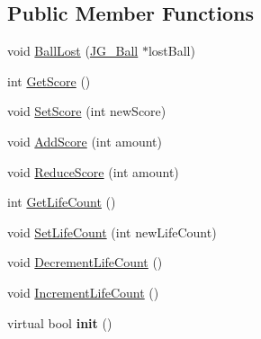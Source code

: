 \subsection*{Public Member Functions}
\begin{DoxyCompactItemize}
\item 
void \hyperlink{class_j_g___game___main_a36ec5b32f8d745363bafa97dbcfc63fd}{Ball\-Lost} (\hyperlink{class_j_g___ball}{J\-G\-\_\-\-Ball} $\ast$lost\-Ball)
\item 
int \hyperlink{class_j_g___game___main_afa38293cf043c824ccfa4aebe1e1545f}{Get\-Score} ()
\item 
void \hyperlink{class_j_g___game___main_a565135339ab0e993ace77fbfc8b39ab2}{Set\-Score} (int new\-Score)
\item 
void \hyperlink{class_j_g___game___main_af1018c29931a8569a468b0b7495ca5cc}{Add\-Score} (int amount)
\item 
void \hyperlink{class_j_g___game___main_a30a9fb93f7a2a61ce90ab1a77525c006}{Reduce\-Score} (int amount)
\item 
int \hyperlink{class_j_g___game___main_a666b141713d126df7e171fc68dd257a2}{Get\-Life\-Count} ()
\item 
void \hyperlink{class_j_g___game___main_a80e74d397b65b98182fb5c2054632899}{Set\-Life\-Count} (int new\-Life\-Count)
\item 
void \hyperlink{class_j_g___game___main_abffce98f5d7c28791aa13e4d081da6ec}{Decrement\-Life\-Count} ()
\item 
void \hyperlink{class_j_g___game___main_a529a8f577bb296cbbe9143f99ae26f1b}{Increment\-Life\-Count} ()
\item 
\hypertarget{class_j_g___game___main_a4d1e63d731fabbe9e57383254a4b21bf}{virtual bool {\bfseries init} ()}\label{class_j_g___game___main_a4d1e63d731fabbe9e57383254a4b21bf}


\end{DoxyCompactItemize}
